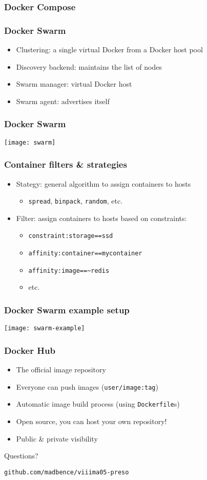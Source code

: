 \documentclass[xetex,mathserif,serif]{beamer}
\begin{document}
  \begin{frame}
    \frametitle{Docker Compose}
  \end{frame}
  \begin{frame}
    \frametitle{Docker Swarm}
    \begin{itemize}
      \item Clustering: a single virtual Docker from a Docker host pool
      \item Discovery backend: maintains the list of nodes
      \item Swarm manager: virtual Docker host
      \item Swarm agent: advertises itself
    \end{itemize}
  \end{frame}
  \begin{frame}
    \frametitle{Docker Swarm}
    \texttt{[image: swarm]}
  \end{frame}
  \begin{frame}
    \frametitle{Container filters \& strategies}
    \begin{itemize}
      \item Stategy: general algorithm to assign containers to hosts
        \begin{itemize}
          \item \texttt{spread}, \texttt{binpack}, \texttt{random}, etc.
        \end{itemize}
      \item Filter: assign containers to hosts based on constraints:
        \begin{itemize}
          \item \texttt{constraint:storage==ssd}
          \item \texttt{affinity:container==mycontainer}
          \item \texttt{affinity:image==\textasciitilde redis}
          \item etc.
        \end{itemize}
    \end{itemize}
  \end{frame}
  \begin{frame}
    \frametitle{Docker Swarm example setup}
    \texttt{[image: swarm-example]}
  \end{frame}
  \begin{frame}
    \frametitle{Docker Hub}
    \begin{itemize}
      \item The official image repository
      \item Everyone can push images (\texttt{user/image:tag})
      \item Automatic image build process (using \texttt{Dockerfile}s)
      \item Open source, you can host your own repository!
      \item Public \& private visibility
    \end{itemize}
  \end{frame}
  \begin{frame}[c,plain]
    \begin{center}
      {\Huge Questions?}

      \vspace{1cm}

      \texttt{github.com/madbence/viiima05-preso}
    \end{center}
  \end{frame}
\end{document}
